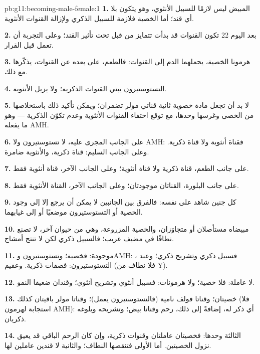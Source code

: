 \begin{solution}{pb:g11:becoming-male-female:1}
\textbf{1.} المبيض ليس لازمًا للسبيل الأنثوي، وهو يتكون بلا أي قند؛
أما الخصية فلازمة للسبيل الذكري ولإزالة القنوات الأنثوية.

\textbf{2.} بعد اليوم 22 تكون القنوات قد بدأت تتمايز من قبل تحت تأثير
القند؛ وعلى التجربة أن تعمل قبل القرار.

\textbf{3.} هرمونا الخصية، يحملهما الدم إلى القنوات: فالطعم، على بعده
عن القنوات، يذكّرها مع ذلك.

\textbf{4.} التستوستيرون يبني القنوات الذكرية؛ ولا يزيل الأنثوية.

\textbf{5.} لا بد أن تجعل مادة خصوية ثانية قناتي مولر تضمران؛ ويمكن
تأكيد ذلك باستخلاصها من الخصى وغرسها وحدها، مع توقع اختفاء القنوات
الأنثوية وعدم تكوّن الذكرية --- وهو ما يفعله AMH.

\textbf{6.} على الجانب المجرى عليه، لا تستوستيرون ولا AMH: فقناة
أنثوية ولا قناة ذكرية. وعلى الجانب السليم: قناة ذكرية، والأنثوية ضامرة.

\textbf{7.} على جانب الطعم، قناة ذكرية ولا قناة أنثوية؛ وعلى الجانب
الآخر، قناة أنثوية فقط.

\textbf{8.} على جانب البلورة، القناتان موجودتان؛ وعلى الجانب الآخر،
القناة الأنثوية فقط.

\textbf{9.} كل جنين شاهد على نفسه: فالفرق بين الجانبين لا يمكن أن يرجع
إلا إلى وجود الخصية أو التستوستيرون موضعيًا أو إلى غيابهما.

\textbf{10.} مبيضاه مستأصلان أو متجاوَزان، والخصية المزروعة، وهي من
حيوان آخر، لا تصنع نطافًا في مضيف غريب؛ فالسبيل ذكري لكن لا تنتج
أمشاج.

\textbf{11.}  موجودة: فخصية؛ وتستوستيرون وAMH: فسبيل ذكري وتشريح
ذكري؛ وعند ، التستوستيرون: فصفات ذكرية. وعقيم (فلا  نطاف
من  Y).

\textbf{12.} لا  عاملة: فلا خصية؛ ولا هرمونات: فسبيل أنثوي وتشريح
أنثوي؛ وقندان ضعيفا النمو.

\textbf{13.} خصيتان؛ وقناتا فولف نامية (فالتستوستيرون يعمل)؛ وقناتا
مولر باقيتان كذلك (فلا استجابة لهرمون AMH): أي ذكر له، إضافةً إلى ذلك، رحم
وقناتا بيض؛ وتشريحه وبلوغه ذكريان.

\textbf{14.} الثالثة وحدها: فخصيتان عاملتان وقنوات ذكرية، وإن كان
الرحم الباقي قد يعيق نزول الخصيتين. أما الأولى فتنقصها  النطاف؛
والثانية لا قندين عاملين لها.


\end{solution}
